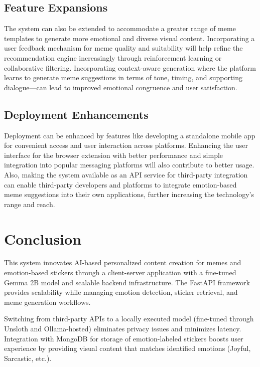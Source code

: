 \documentclass[conference]{IEEEtran}
\begin{document}
\subsection{Feature Expansions}
The system can also be extended to accommodate a greater range of meme templates to generate more emotional and diverse visual content. Incorporating a user feedback mechanism for meme quality and suitability will help refine the recommendation engine increasingly through reinforcement learning or collaborative filtering. Incorporating context-aware generation where the platform learns to generate meme suggestions in terms of tone, timing, and supporting dialogue—can lead to improved emotional congruence and user satisfaction.

\subsection{Deployment Enhancements}
Deployment can be enhanced by features like developing a standalone mobile app for convenient access and user interaction across platforms. Enhancing the user interface for the browser extension with better performance and simple integration into popular messaging platforms will also contribute to better usage. Also, making the system available as an API service for third-party integration can enable third-party developers and platforms to integrate emotion-based meme suggestions into their own applications, further increasing the technology’s range and reach.

%

\section{Conclusion}
This system innovates AI-based personalized content creation for memes and emotion-based stickers through a client-server application with a fine-tuned Gemma 2B model and scalable backend infrastructure. The FastAPI framework provides scalability while managing emotion detection, sticker retrieval, and meme generation workflows.

Switching from third-party APIs to a locally executed model (fine-tuned through Unsloth and Ollama-hosted) eliminates privacy issues and minimizes latency. Integration with MongoDB for storage of emotion-labeled stickers boosts user experience by providing visual content that matches identified emotions (Joyful, Sarcastic, etc.).
\end{document}
